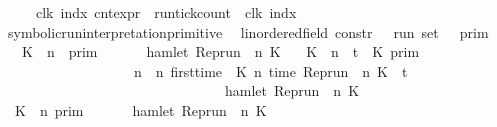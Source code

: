 \begin{isabellebody}
{\isacharbar}\ {\isacartoucheopen}{\isasymlbrakk}\ {\isasymrho}\ {\isasymturnstile}\ {\isacharhash}\isactrlsup {\isasymle}\ clk\ indx\ {\isasymrbrakk}\isactrlsub c\isactrlsub n\isactrlsub t\isactrlsub e\isactrlsub x\isactrlsub p\isactrlsub r\ {\isacharequal}\ run{\isacharunderscore}tick{\isacharunderscore}count\ {\isasymrho}\ clk\ indx{\isacartoucheclose}\isanewline
\isanewline
\isanewline
{}\isamarkupfalse%
\ symbolic{\isacharunderscore}run{\isacharunderscore}interpretation{\isacharunderscore}primitive\isanewline
\ \ {\isacharcolon}{\isacharcolon}{\isacartoucheopen}{\isacharparenleft}{\isacharprime}{\isasymtau}{\isacharcolon}{\isacharcolon}linordered{\isacharunderscore}field{\isacharparenright}\ constr\ {\isasymRightarrow}\ {\isacharprime}{\isasymtau}\ run\ set{\isacartoucheclose}\ {\isacharparenleft}{\isacartoucheopen}{\isasymlbrakk}\ {\isacharunderscore}\ {\isasymrbrakk}\isactrlsub p\isactrlsub r\isactrlsub i\isactrlsub m{\isacartoucheclose}{\isacharparenright}\isanewline
{}\isanewline
\ \ {\isacartoucheopen}{\isasymlbrakk}\ K\ {\isasymUp}\ n\ \ {\isasymrbrakk}\isactrlsub p\isactrlsub r\isactrlsub i\isactrlsub m\ \ \ \ \ {\isacharequal}\ {\isacharbraceleft}{\isasymrho}{\isachardot}\ hamlet\ {\isacharparenleft}{\isacharparenleft}Rep{\isacharunderscore}run\ {\isasymrho}{\isacharparenright}\ n\ K{\isacharparenright}\ {\isacharbraceright}{\isacartoucheclose}\isanewline
{\isacharbar}\ {\isacartoucheopen}{\isasymlbrakk}\ K\ {\isacharat}\ n\ {\isasymoplus}\ {\isasymdelta}t\ {\isasymRightarrow}\ K{\isacharprime}\ {\isasymrbrakk}\isactrlsub p\isactrlsub r\isactrlsub i\isactrlsub m\ {\isacharequal}\isanewline
\ \ \ \ \ \ \ \ \ \ \ \ \ \ \ \ \ \ {\isacharbraceleft}{\isasymrho}{\isachardot}\ {\isasymforall}n\ {\isasymge}\ n\ first{\isacharunderscore}time\ {\isasymrho}\ K\ n\ {\isacharparenleft}time\ {\isacharparenleft}{\isacharparenleft}Rep{\isacharunderscore}run\ {\isasymrho}{\isacharparenright}\ n\ K{\isacharparenright}\ {\isacharplus}\ {\isasymdelta}t{\isacharparenright}\isanewline
\ \ \ \ \ \ \ \ \ \ \ \ \ \ \ \ \ \ \ \ \ \ \ \ \ \ \ \ \ \ \ {\isasymlongrightarrow}\ hamlet\ {\isacharparenleft}{\isacharparenleft}Rep{\isacharunderscore}run\ {\isasymrho}{\isacharparenright}\ n\ K{\isacharprime}{\isacharparenright}{\isacharbraceright}{\isacartoucheclose}\isanewline
{\isacharbar}\ {\isacartoucheopen}{\isasymlbrakk}\ K\ {\isasymnot}{\isasymUp}\ n\ {\isasymrbrakk}\isactrlsub p\isactrlsub r\isactrlsub i\isactrlsub m\ \ \ \ \ {\isacharequal}\ {\isacharbraceleft}{\isasymrho}{\isachardot}\ {\isasymnot}hamlet\ {\isacharparenleft}{\isacharparenleft}Rep{\isacharunderscore}run\ {\isasymrho}{\isacharparenright}\ n\ K{\isacharparenright}\ {\isacharbraceright}{\isacartoucheclose}\isanewline

\end{isabellebody}
